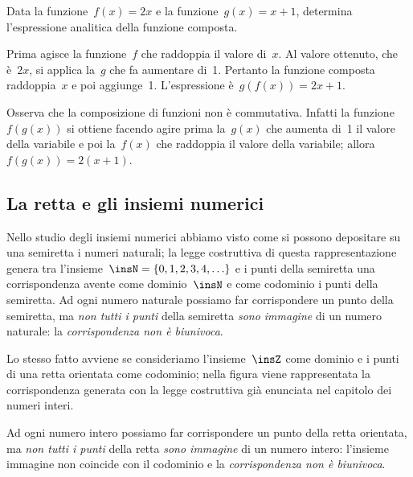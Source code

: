 \begin{exrig}
 \begin{esempio}
 Data la funzione~$f(x)=2x$ e la funzione~$g(x)=x+1$, determina
l'espressione analitica della funzione composta.

Prima agisce la funzione~$f$ che raddoppia il valore di~$x$. Al valore
ottenuto, che è~$2x$, si applica la~$g$ che fa aumentare di~1. Pertanto
la funzione composta raddoppia~$x$ e poi aggiunge~1.
L'espressione è~$g(f(x))=2x+1$.
 \end{esempio}

\end{exrig}

Osserva che la composizione di funzioni non è commutativa. Infatti la
funzione~$f(g(x))$ si ottiene facendo agire prima la~$g(x)$ che aumenta di~1
il valore della variabile e poi la~$f(x)$ che raddoppia il valore della
variabile; allora~$f(g(x))=2(x+1)$.


\subsection{La retta e gli insiemi numerici}
\label{subsec:fun_retta}

Nello studio degli insiemi numerici abbiamo visto come si possono depositare su 
una semiretta i numeri naturali;
la legge costruttiva di questa rappresentazione genera tra 
l'insieme~$\insN=\{0,1,2,3,4,\ldots \}$ e i punti della
semiretta una corrispondenza avente come dominio~$\insN$ e come codominio i 
punti della semiretta.
Ad ogni numero naturale possiamo far corrispondere un punto della semiretta, ma 
\emph{non tutti i punti} della semiretta
\emph{sono immagine} di un numero naturale: la \emph{corrispondenza non è 
biunivoca}.

Lo stesso fatto avviene se consideriamo l'insieme~$\insZ$ come dominio e i punti 
di una retta orientata come codominio;
nella figura viene rappresentata la corrispondenza generata con la legge 
costruttiva già enunciata nel capitolo dei numeri interi.
\begin{center}
 
\end{center}

Ad ogni numero intero possiamo far corrispondere un punto della retta orientata, 
ma \emph{non tutti i punti} della retta \emph{sono immagine}
di un numero intero: l'insieme immagine non coincide con il codominio e la 
\emph{corrispondenza non è biunivoca}.

